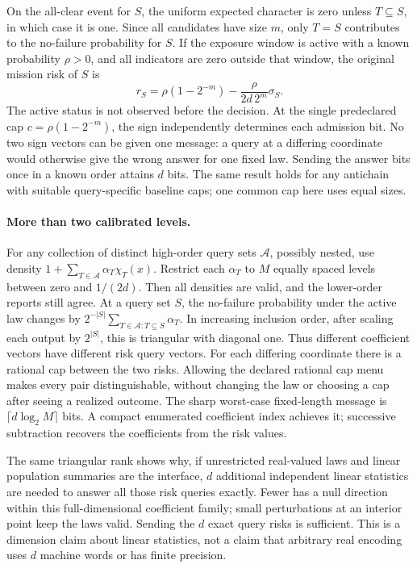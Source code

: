 \documentclass{article}
\begin{document}
On the all-clear event for \(S\), the uniform expected
character is zero unless \(T\subseteq S\), in which case it
is one. Since all candidates have size \(m\), only \(T=S\)
contributes to the no-failure probability for \(S\).
If the exposure window is active with a known probability
\(\rho>0\), and all indicators are zero outside that window,
the original mission risk of \(S\) is
\[
  r_S=\rho(1-2^{-m})-\frac{\rho}{2d\,2^m}\sigma_S .
\]
The active status is not observed before the decision. At the
single predeclared cap \(c=\rho(1-2^{-m})\), the sign independently
determines each admission bit. No two sign vectors can be given
one message: a query at a differing coordinate would otherwise
give the wrong answer for one fixed law. Sending the answer bits
once in a known order attains \(d\) bits. The same result holds
for any antichain with suitable query-specific baseline caps;
one common cap here uses equal sizes.

\paragraph{More than two calibrated levels.}
For any collection of distinct high-order query sets
\(\mathcal A\), possibly nested, use density
\(1+\sum_{T\in\mathcal A}\alpha_T\chi_T(x)\).
Restrict each \(\alpha_T\) to \(M\) equally spaced levels
between zero and \(1/(2d)\). Then all densities are valid,
and the lower-order reports still agree. At a query set \(S\),
the no-failure probability under the active law changes by
\(2^{-|S|}\sum_{T\in\mathcal A:T\subseteq S}\alpha_T\).
In increasing inclusion order, after scaling each output by
\(2^{|S|}\), this is triangular with diagonal one. Thus different
coefficient vectors have different risk query vectors.
For each differing coordinate there is a rational cap between
the two risks. Allowing the declared rational cap menu makes
every pair distinguishable, without changing the law or choosing
a cap after seeing a realized outcome. The sharp worst-case
fixed-length message is \(\lceil d\log_2 M\rceil\) bits.
A compact enumerated coefficient index achieves it; successive
subtraction recovers the coefficients from the risk values.

The same triangular rank shows why, if unrestricted real-valued
laws and linear population summaries are the interface, \(d\)
additional independent linear statistics are needed to answer
all those risk queries exactly. Fewer has a null direction within
this full-dimensional coefficient family; small perturbations at
an interior point keep the laws valid. Sending the \(d\) exact
query risks is sufficient. This is a dimension claim about linear
statistics, not a claim that arbitrary real encoding uses \(d\)
machine words or has finite precision.
\end{document}
